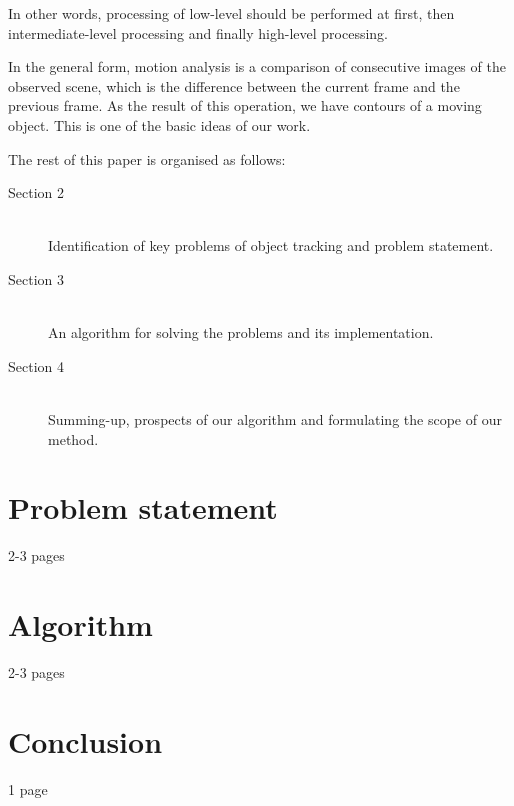 \documentclass[12pt,a4paper,oneside,titlepage]{article}
\begin{document}
In other words, processing of low-level should be performed at first, then intermediate-level processing and finally high-level processing.

In the general form, motion analysis is a comparison of consecutive images of the observed scene, which is the difference between the current frame and the previous frame.
As the result of this operation, we have contours of a moving object.
This is one of the basic ideas of our work.

The rest of this paper is organised as follows:
\begin{description}
  \item[Section 2] \hfill \\
  Identification of key problems of object tracking and problem statement.
  \item[Section 3] \hfill \\
  An algorithm for solving the problems and its implementation. 
  \item[Section 4] \hfill \\
  Summing-up, prospects of our algorithm and formulating the scope of our method.
\end{description}

\newpage
\section*{Problem statement}
2-3 pages



\newpage
\section*{Algorithm}
2-3 pages



\newpage
\section*{Conclusion}
1 page


\newpage
\renewcommand\refname{Bibliography}


\end{document}
